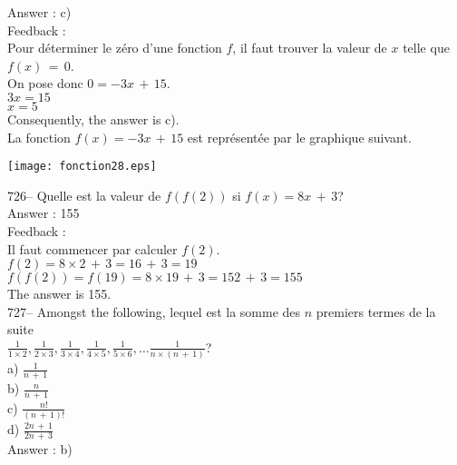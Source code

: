 \documentclass[letterpaper, 12pt]{article}
\begin{document}
Answer : c)\\

Feedback : \\
Pour d\'eterminer le z\'ero d'une fonction $f$, il faut trouver la valeur de
$x$ telle que $f(x)\,=\,0$.\\
On pose donc $0=-3x\,+\,15$.\\
$3x=15$\\
$x=5$\\
Consequently, the answer is c).\\
La fonction $f(x)=-3x\,+\,15$ est repr\'esent\'ee par le graphique
suivant.\\
    \begin{center}
    \texttt{[image: fonction28.eps]}
    \end{center}

726-- Quelle est la valeur de $f(f(2))$ si $f(x)=8x\,+\,3$?\\

Answer : 155\\

Feedback : \\
Il faut commencer par calculer $f(2)$.\\
$f(2)=8\times2\,+\,3=16\,+\,3=19$\\
$f(f(2))=f(19)=8\times19\,+\,3= 152\,+\,3=155$\\
The answer is 155.\\

727-- Amongst the following, lequel est la somme des $n$ premiers
termes de la suite \\$\frac{1}{1\times2}, \frac{1}{2\times3},
\frac{1}{3\times4}, \frac{1}{4\times5}, \frac{1}{5\times6}, \ldots
\frac{1}{n\times(n\,+\,1)}$?\\
a) $\frac{1}{n\,+\,1}$\\[2mm]
b) $\frac{n}{n\,+\,1}$\\[2mm]
c) $\frac{n!}{(n\,+\,1)!}$\\[2mm]
d) $\frac{2n\,+\,1}{2n\,+\,3}$\\

Answer : b)\\
\end{document}
